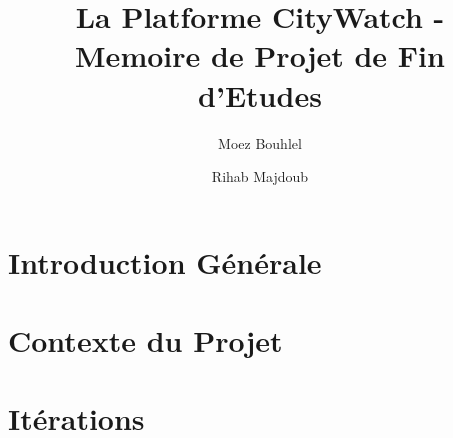 \documentclass[
a4paper,
12pt,
onecolumn,
titlepage,
final,
]{article} %
\title{La Platforme CityWatch - Memoire de Projet de Fin d'Etudes}
\author{Moez Bouhlel}
\author{Rihab Majdoub}
\affil{Faculté des Sciences de Sfax, Tunisie}
\renewcommand{\baselinestretch}{1.2}\normalsize
\begin{document}


\pagestyle{empty}


\cleardoublepage



\pagestyle{plain}

\setlength{\parskip}{0pt}
\hypersetup{linkcolor=black}
\setcounter{tocdepth}{3}

\tableofcontents

\clearpage
\listoffigures

\clearpage
\listoftables





\cleardoublepage
\setlength{\parskip}{8pt}
\renewcommand{\baselinestretch}{1.4}\normalsize
\fancyhf{}
\rhead{\rightmark}
\rfoot{\thepage}
\renewcommand{\headrulewidth}{1pt}
\pagestyle{fancy}
\renewcommand{\sectionmark}[1]{\markright{\thesection\ \ --\ \ #1}}

\cleardoublepage
\part{Introduction Générale}


\cleardoublepage
\part{Contexte du Projet}


\cleardoublepage
\part{Itérations}





\end{document}
